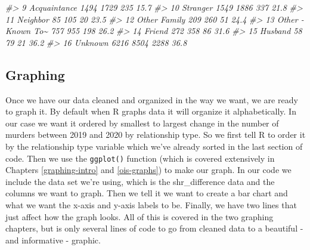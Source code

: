 \documentclass[
]{krantz}
\makeatletter
\newenvironment{Shaded}{\begin{snugshade}}{\end{snugshade}}
\newcommand{\CommentTok}[1]{\textcolor[rgb]{0.37,0.37,0.37}{\textit{#1}}}
\newenvironment{kframe}{%
\medskip{}
\setlength{\fboxsep}{.8em}
 \def\at@end@of@kframe{}%
 \ifinner\ifhmode%
  \def\at@end@of@kframe{\end{minipage}}%
  \begin{minipage}{\columnwidth}%
 \fi\fi%
 \def\FrameCommand##1{\hskip\@totalleftmargin \hskip-\fboxsep
 \colorbox{shadecolor}{##1}\hskip-\fboxsep
     \hskip-\linewidth \hskip-\@totalleftmargin \hskip\columnwidth}%
 \MakeFramed {\advance\hsize-\width
   \@totalleftmargin\z@ \linewidth\hsize
   \@setminipage}}%
 {\par\unskip\endMakeFramed%
 \at@end@of@kframe}
\renewenvironment{Shaded}{\begin{kframe}}{\end{kframe}}
\makeatother
\begin{document}
\begin{Shaded}
\begin{Highlighting}[]
\CommentTok{\#\textgreater{}  9 Acquaintance        1494   1729        235          15.7 }
\CommentTok{\#\textgreater{} 10 Stranger            1549   1886        337          21.8 }
\CommentTok{\#\textgreater{} 11 Neighbor              85    105         20          23.5 }
\CommentTok{\#\textgreater{} 12 Other Family         209    260         51          24.4 }
\CommentTok{\#\textgreater{} 13 Other {-} Known To\textasciitilde{}    757    955        198          26.2 }
\CommentTok{\#\textgreater{} 14 Friend               272    358         86          31.6 }
\CommentTok{\#\textgreater{} 15 Husband               58     79         21          36.2 }
\CommentTok{\#\textgreater{} 16 Unknown             6216   8504       2288          36.8}
\end{Highlighting}
\end{Shaded}

\hypertarget{graphing}{%
\subsection{Graphing}\label{graphing}}

Once we have our data cleaned and organized in the way we
want, we are ready to graph it. By default when R graphs
data it will organize it alphabetically. In our case we want
it ordered by smallest to largest change in the number of
murders between 2019 and 2020 by relationship type. So we
first tell R to order it by the relationship type variable
which we've already sorted in the last section of code. Then
we use the \texttt{ggplot()} function (which is covered
extensively in Chapters \ref{graphing-intro} and
\ref{ois-graphs}) to make our graph. In our code we include
the data set we're using, which is the shr\_difference data
and the columns we want to graph. Then we tell it we want to
create a bar chart and what we want the x-axis and y-axis
labels to be. Finally, we have two lines that just affect
how the graph looks. All of this is covered in the two
graphing chapters, but is only several lines of code to go
from cleaned data to a beautiful - and informative -
graphic.
\end{document}
